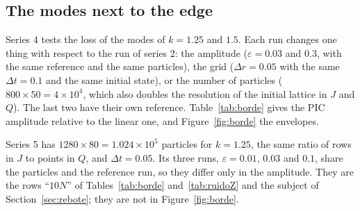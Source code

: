 \documentclass[11pt,a4paper]{article}
\begin{document}
\subsection{The modes next to the edge}
\label{sec:borde}

Series 4 tests the loss of the modes of $k=1.25$ and $1.5$. Each run changes one thing with
respect to the run of series 2: the amplitude ($\varepsilon=0.03$ and $0.3$, with the same
reference and the same particles), the grid ($\Delta r=0.05$ with the same $\Delta t=0.1$ and the
same initial state), or the number of particles ($800\times50=4\times10^4$, which also
doubles the resolution of the initial lattice in $J$ and $Q$). The last two have their own
reference. Table~\ref{tab:borde} gives the PIC amplitude relative to the linear one, and
Figure~\ref{fig:borde} the envelopes.

Series 5 has $1280\times80=1.024\times10^5$ particles for $k=1.25$, the same ratio of rows in $J$
to points in $Q$, and $\Delta t=0.05$. Its three runs, $\varepsilon=0.01$, $0.03$ and $0.1$, share
the particles and the reference run, so they differ only in the amplitude. They are the rows
``$10N$'' of Tables~\ref{tab:borde} and~\ref{tab:ruidoZ} and the subject of
Section~\ref{sec:rebote}; they are not in Figure~\ref{fig:borde}.
\end{document}
